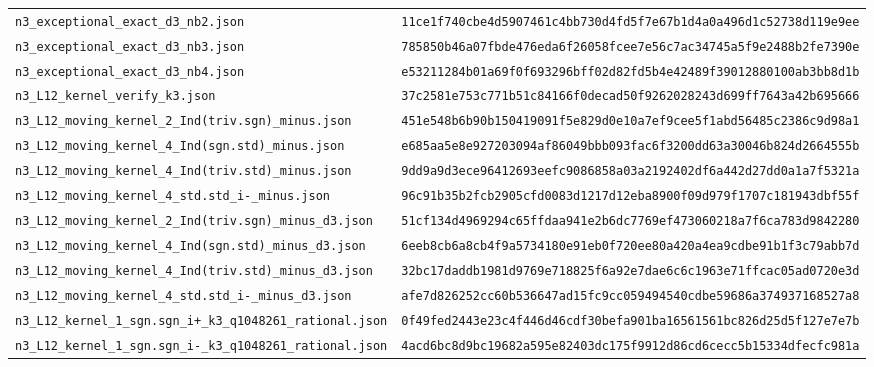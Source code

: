 \documentclass[aps,prx,reprint,superscriptaddress,nobibnotes,longbibliography]{revtex4-2}
\begin{document}
\begin{table}[t]
\begin{ruledtabular}
\begin{tabular}{ll}
\texttt{n3\_exceptional\_exact\_d3\_nb2.json} & \texttt{\scriptsize 11ce1f740cbe4d5907461c4bb730d4fd5f7e67b1d4a0a496d1c52738d119e9ee}\\
\texttt{n3\_exceptional\_exact\_d3\_nb3.json} & \texttt{\scriptsize 785850b46a07fbde476eda6f26058fcee7e56c7ac34745a5f9e2488b2fe7390e}\\
\texttt{n3\_exceptional\_exact\_d3\_nb4.json} & \texttt{\scriptsize e53211284b01a69f0f693296bff02d82fd5b4e42489f39012880100ab3bb8d1b}\\
\texttt{n3\_L12\_kernel\_verify\_k3.json} & \texttt{\scriptsize 37c2581e753c771b51c84166f0decad50f9262028243d699ff7643a42b695666}\\
\texttt{n3\_L12\_moving\_kernel\_2\_Ind(triv.sgn)\_minus.json} & \texttt{\scriptsize 451e548b6b90b150419091f5e829d0e10a7ef9cee5f1abd56485c2386c9d98a1}\\
\texttt{n3\_L12\_moving\_kernel\_4\_Ind(sgn.std)\_minus.json} & \texttt{\scriptsize e685aa5e8e927203094af86049bbb093fac6f3200dd63a30046b824d2664555b}\\
\texttt{n3\_L12\_moving\_kernel\_4\_Ind(triv.std)\_minus.json} & \texttt{\scriptsize 9dd9a9d3ece96412693eefc9086858a03a2192402df6a442d27dd0a1a7f5321a}\\
\texttt{n3\_L12\_moving\_kernel\_4\_std.std\_i-\_minus.json} & \texttt{\scriptsize 96c91b35b2fcb2905cfd0083d1217d12eba8900f09d979f1707c181943dbf55f}\\
\texttt{n3\_L12\_moving\_kernel\_2\_Ind(triv.sgn)\_minus\_d3.json} & \texttt{\scriptsize 51cf134d4969294c65ffdaa941e2b6dc7769ef473060218a7f6ca783d9842280}\\
\texttt{n3\_L12\_moving\_kernel\_4\_Ind(sgn.std)\_minus\_d3.json} & \texttt{\scriptsize 6eeb8cb6a8cb4f9a5734180e91eb0f720ee80a420a4ea9cdbe91b1f3c79abb7d}\\
\texttt{n3\_L12\_moving\_kernel\_4\_Ind(triv.std)\_minus\_d3.json} & \texttt{\scriptsize 32bc17daddb1981d9769e718825f6a92e7dae6c6c1963e71ffcac05ad0720e3d}\\
\texttt{n3\_L12\_moving\_kernel\_4\_std.std\_i-\_minus\_d3.json} & \texttt{\scriptsize afe7d826252cc60b536647ad15fc9cc059494540cdbe59686a374937168527a8}\\
\texttt{n3\_L12\_kernel\_1\_sgn.sgn\_i+\_k3\_q1048261\_rational.json} & \texttt{\scriptsize 0f49fed2443e23c4f446d46cdf30befa901ba16561561bc826d25d5f127e7e7b}\\
\texttt{n3\_L12\_kernel\_1\_sgn.sgn\_i-\_k3\_q1048261\_rational.json} & \texttt{\scriptsize 4acd6bc8d9bc19682a595e82403dc175f9912d86cd6cecc5b15334dfecfc981a}\\

\end{tabular}
\end{ruledtabular}
\end{table}
\end{document}
